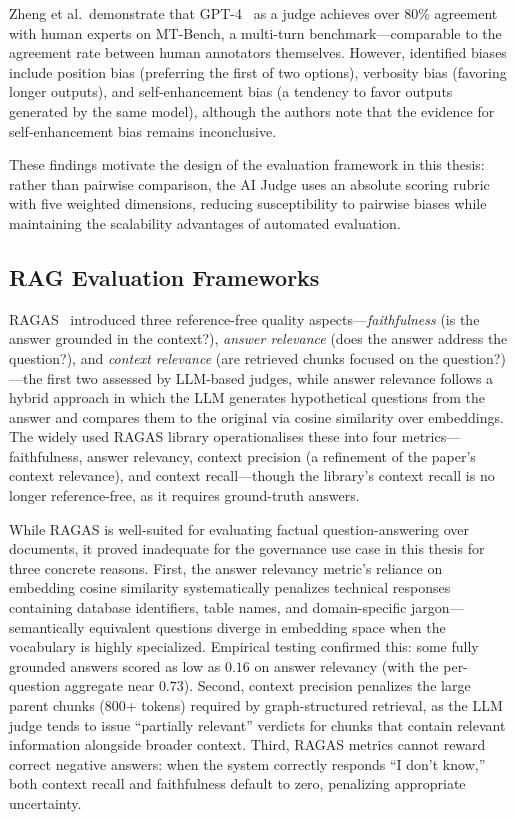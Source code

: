 Zheng et al.\ demonstrate that GPT-4~\cite{openai2023gpt4} as a judge achieves over 80\% agreement with human experts on MT-Bench, a multi-turn benchmark---comparable to the agreement rate between human annotators themselves. However, identified biases include position bias (preferring the first of two options), verbosity bias (favoring longer outputs), and self-enhancement bias (a tendency to favor outputs generated by the same model), although the authors note that the evidence for self-enhancement bias remains inconclusive.

These findings motivate the design of the evaluation framework in this thesis: rather than pairwise comparison, the AI Judge uses an absolute scoring rubric with five weighted dimensions, reducing susceptibility to pairwise biases while maintaining the scalability advantages of automated evaluation.

\subsection{RAG Evaluation Frameworks}
\label{sec:rw:rag_eval}

RAGAS~\cite{es2025ragasautomatedevaluationretrieval} introduced three reference-free quality aspects---\emph{faithfulness} (is the answer grounded in the context?), \emph{answer relevance} (does the answer address the question?), and \emph{context relevance} (are retrieved chunks focused on the question?)---the first two assessed by LLM-based judges, while answer relevance follows a hybrid approach in which the LLM generates hypothetical questions from the answer and compares them to the original via cosine similarity over embeddings. The widely used RAGAS library operationalises these into four metrics---faithfulness, answer relevancy, context precision (a refinement of the paper's context relevance), and context recall---though the library's context recall is no longer reference-free, as it requires ground-truth answers.

While RAGAS is well-suited for evaluating factual question-answering over documents, it proved inadequate for the governance use case in this thesis for three concrete reasons. First, the answer relevancy metric's reliance on embedding cosine similarity systematically penalizes technical responses containing database identifiers, table names, and domain-specific jargon---semantically equivalent questions diverge in embedding space when the vocabulary is highly specialized. Empirical testing confirmed this: some fully grounded answers scored as low as $0.16$ on answer relevancy (with the per-question aggregate near $0.73$). Second, context precision penalizes the large parent chunks (800+ tokens) required by graph-structured retrieval, as the LLM judge tends to issue ``partially relevant'' verdicts for chunks that contain relevant information alongside broader context. Third, RAGAS metrics cannot reward correct negative answers: when the system correctly responds ``I don't know,'' both context recall and faithfulness default to zero, penalizing appropriate uncertainty.

